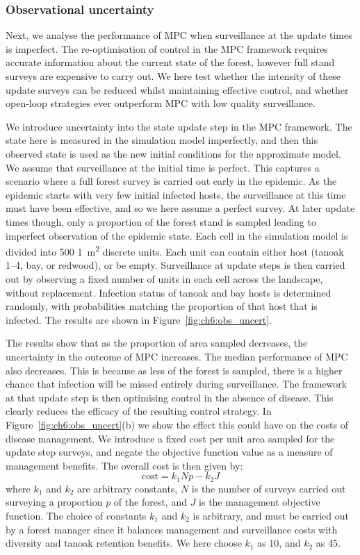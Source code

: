 \subsubsection{Observational uncertainty}

Next, we analyse the performance of MPC when surveillance at the update times is imperfect. The re-optimisation of control in the MPC framework requires accurate information about the current state of the forest, however full stand surveys are expensive to carry out. We here test whether the intensity of these update surveys can be reduced whilst maintaining effective control, and whether open-loop strategies ever outperform MPC with low quality surveillance.

We introduce uncertainty into the state update step in the MPC framework. The state here is measured in the simulation model imperfectly, and then this observed state is used as the new initial conditions for the approximate model. We assume that surveillance at the initial time is perfect. This captures a scenario where a full forest survey is carried out early in the epidemic. As the epidemic starts with very few initial infected hosts, the surveillance at this time must have been effective, and so we here assume a perfect survey. At later update times though, only a proportion of the forest stand is sampled leading to imperfect observation of the epidemic state. Each cell in the simulation model is divided into 500 \SI{1}{\meter\squared} discrete units. Each unit can contain either host (tanoak 1--4, bay, or redwood), or be empty. Surveillance at update steps is then carried out by observing a fixed number of units in each cell across the landscape, without replacement. Infection status of tanoak and bay hosts is determined randomly, with probabilities matching the proportion of that host that is infected. The results are shown in Figure~\ref{fig:ch6:obs_uncert}.

The results show that as the proportion of area sampled decreases, the uncertainty in the outcome of MPC increases. The median performance of MPC also decreases. This is because as less of the forest is sampled, there is a higher chance that infection will be missed entirely during surveillance. The framework at that update step is then optimising control in the absence of disease. This clearly reduces the efficacy of the resulting control strategy. In Figure~\ref{fig:ch6:obs_uncert}(b) we show the effect this could have on the costs of disease management. We introduce a fixed cost per unit area sampled for the update step surveys, and negate the objective function value as a measure of management benefits. The overall cost is then given by:
\begin{equation}
    \textrm{cost} = k_1Np - k_2J
\end{equation}
where $k_1$ and $k_2$ are arbitrary constants, $N$ is the number of surveys carried out surveying a proportion $p$ of the forest, and $J$ is the management objective function. The choice of constants $k_1$ and $k_2$ is arbitrary, and must be carried out by a forest manager since it balances management and surveillance costs with diversity and tanoak retention benefits. We here choose $k_1$ as 10, and $k_2$ as 45.

